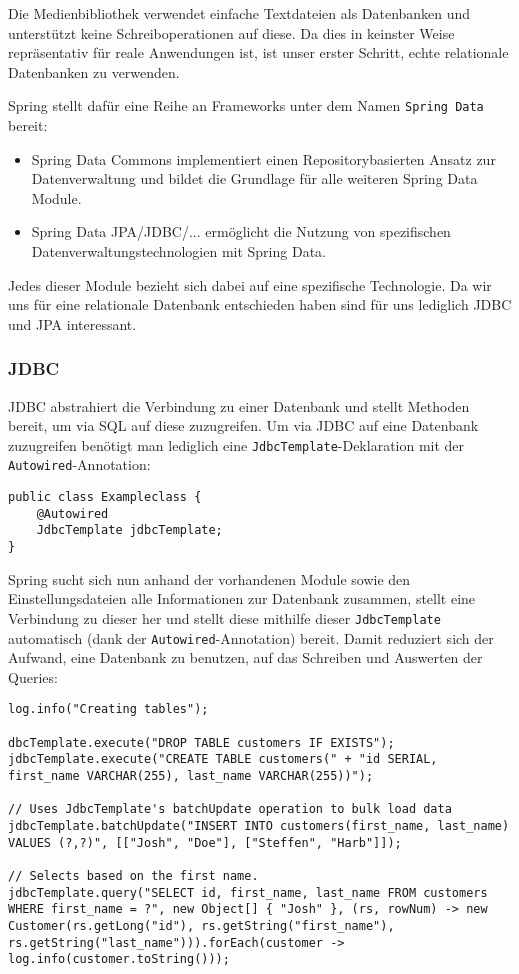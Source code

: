 \documentclass{article}
\begin{document}
Die Medienbibliothek verwendet einfache Textdateien als Datenbanken und unterstützt keine Schreiboperationen auf diese.
 Da dies in keinster Weise repräsentativ für reale Anwendungen ist, ist unser erster Schritt, echte relationale Datenbanken zu verwenden.

Spring stellt dafür eine Reihe an Frameworks unter dem Namen \texttt{Spring Data} bereit:
\begin{itemize}
        \item{Spring Data Commons} {implementiert einen Repositorybasierten Ansatz zur Datenverwaltung und bildet die Grundlage für alle weiteren Spring Data Module.}
        \item{Spring Data JPA/JDBC/...} ermöglicht die Nutzung von spezifischen Datenverwaltungstechnologien mit Spring Data.
\end{itemize}

Jedes dieser Module bezieht sich dabei auf eine spezifische Technologie.
 Da wir uns für eine relationale Datenbank entschieden haben sind für uns lediglich JDBC und JPA interessant.

\subsubsection{JDBC}

JDBC abstrahiert die Verbindung zu einer Datenbank und stellt Methoden bereit, um via SQL auf diese zuzugreifen.
Um via JDBC auf eine Datenbank zuzugreifen benötigt man lediglich eine \texttt{JdbcTemplate}-Deklaration mit der \texttt{Autowired}-Annotation:

\begin{lstlisting}
public class Exampleclass {
    @Autowired
    JdbcTemplate jdbcTemplate;
}
\end{lstlisting}

Spring sucht sich nun anhand der vorhandenen Module sowie den Einstellungsdateien alle Informationen zur Datenbank zusammen, stellt eine Verbindung zu dieser her und stellt diese mithilfe dieser \texttt{JdbcTemplate} automatisch (dank der \texttt{Autowired}-Annotation) bereit.
 Damit reduziert sich der Aufwand, eine Datenbank zu benutzen, auf das Schreiben und Auswerten der Queries:

\begin{lstlisting}
log.info("Creating tables");

dbcTemplate.execute("DROP TABLE customers IF EXISTS");
jdbcTemplate.execute("CREATE TABLE customers(" + "id SERIAL, first_name VARCHAR(255), last_name VARCHAR(255))");

// Uses JdbcTemplate's batchUpdate operation to bulk load data
jdbcTemplate.batchUpdate("INSERT INTO customers(first_name, last_name) VALUES (?,?)", [["Josh", "Doe"], ["Steffen", "Harb"]]);

// Selects based on the first name.
jdbcTemplate.query("SELECT id, first_name, last_name FROM customers WHERE first_name = ?", new Object[] { "Josh" }, (rs, rowNum) -> new Customer(rs.getLong("id"), rs.getString("first_name"), rs.getString("last_name"))).forEach(customer -> log.info(customer.toString()));
\end{lstlisting}
\end{document}
